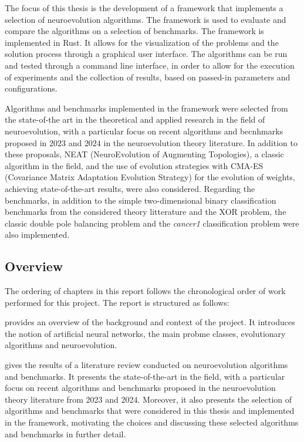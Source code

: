 The focus of this thesis is the development of a framework that implements a selection of neuroevolution algorithms.
The framework is used to evaluate and compare the algorithms on a selection of benchmarks.
The framework is implemented in Rust. It allows for the visualization of the problems and the solution process through a graphical user interface.
The algorithms can be run and tested through a command line interface, in order to allow for the execution of experiments and the collection of results,
based on passed-in parameters and configurations.

Algorithms and benchmarks implemented in the framework were selected from the state-of-the art in the theoretical and applied research in the field of neuroevolution,
with a particular focus on recent algorithms and becnhmarks proposed in $2023$ and $2024$ in the neuroevolution theory literature.
In addition to these proposals, NEAT (NeuroEvolution of Augmenting Topologies), a classic algorithm in the field, and the use of evolution strategies with CMA-ES
(Covariance Matrix Adaptation Evolution Strategy) for the evolution of weights, achieving state-of-the-art results, were also considered.
Regarding the benchmarks, in addition to the simple two-dimensional binary classification benchmarks from the considered theory litterature and the XOR problem, the
classic double pole balancing problem and the \textit{cancer1} classification problem were also implemented.

\subsection{Overview}

The ordering of chapters in this report follows the chronological order of work performed for this project.
The report is structured as follows:

 provides an overview of the background and context of the project. It introduces the notion of artificial neural networks, the main probme classes,
evolutionary algorithms and neuroevolution.

 gives the results of a literature review conducted on neuroevolution algorithms and benchmarks. It presents the state-of-the-art in the field,
with a particular focus on recent algorithms and benchmarks proposed in the neuroevolution theory literature from 2023 and 2024.
Moreover, it also presents the selection of algorithms and benchmarks that were considered in this thesis and implemented in the framework, motivating the choices and
discussing these selected algorithms and benchmarks in further detail.

